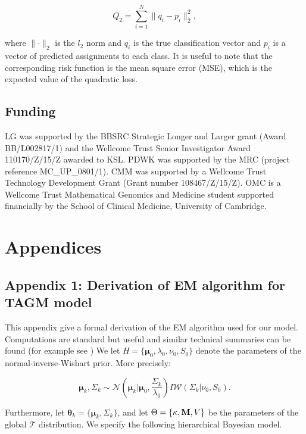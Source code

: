 \documentclass[12pt,english]{article}\usepackage[]{graphicx}\usepackage[]{color}
\begin{document}
\begin{equation}
  Q_2 = \sum_{i = 1}^{N}\lVert q_i - p_i\rVert_2^2,
\end{equation}

where $\lVert\cdot\rVert_2$ is the $l_2$ norm and $q_i$ is the true
classification vector and $p_i$ is a vector of predicted assignments
to each class. It is useful to note that the corresponding risk
function is the mean square error (MSE), which is the expected value
of the quadratic loss.

\subsection*{Funding}

LG was supported by the BBSRC Strategic Longer and Larger grant (Award
BB/L002817/1) and the Wellcome Trust Senior Investigator Award
110170/Z/15/Z awarded to KSL. PDWK was supported by the MRC (project
reference MC\_UP\_0801/1). CMM was supported by a Wellcome Trust
Technology Development Grant (Grant number 108467/Z/15/Z). OMC is a
Wellcome Trust Mathematical Genomics and Medicine student supported
financially by the School of Clinical Medicine, University of Cambridge.

\clearpage

\section{Appendices}

\subsection{Appendix 1: Derivation of EM algorithm for TAGM model}\label{apd:EMderv}

This appendix give a formal derivation of the EM algorithm used for
our model. Computations are standard but useful and similar technical
summaries can be found (for example see \cite{Fraley:2005,
  Murphy:2007}) We let
$H = \{\boldsymbol{\mu}_0, \lambda_0, \nu_0, S_0\}$ denote the
parameters of the normal-inverse-Wishart prior. More precisely:

\begin{equation} \label{equation::prior}
\boldsymbol{\mu}_k, \Sigma_k\sim \mathcal{N}\left(\boldsymbol{\mu}_k|\boldsymbol{\mu}_0, \frac{\Sigma_{k}}{\lambda_0}\right)I\mathcal{W}\left(\Sigma_{k}|\nu_0, S_0\right).
\end{equation}

Furthermore, let
$\boldsymbol{\theta}_k = \{\boldsymbol{\mu}_k, \Sigma_{k}\}$, and let
$\Theta = \{\kappa, {\bf M},V\}$ be the parameters of the global
$\mathcal{T}$ distribution. We specify the following hierarchical
Bayesian model.
\end{document}
